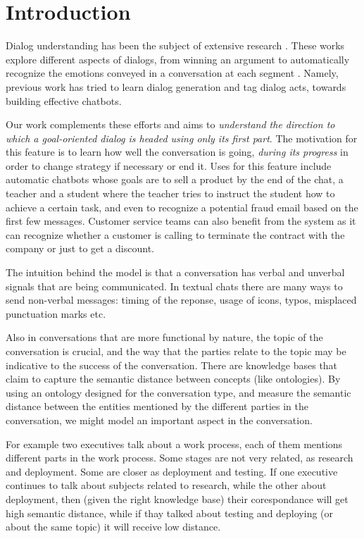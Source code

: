 \section{Introduction}\label{sec:into}
Dialog understanding has been the subject of 
extensive research \cite{BohusR03,BordesW16,GhazvininejadBC17,ShawarA03,DBLP:conf/icassp/JiB05,DBLP:conf/coling/WermterL96}. 
These works explore different aspects of dialogs, from winning an argument \cite{TanNDL16} 
to automatically recognize the emotions conveyed in a conversation at each segment \cite{AyadiKK11}. 
Namely, previous work \cite{ShawarA03,Jia09,ShawarA08,AngLS05,SurendranL06} has tried to learn dialog 
generation and tag dialog acts, towards building effective chatbots. 

Our work complements these efforts and aims to {\em understand the 
direction to which a goal-oriented dialog is headed using only its 
first part}. The motivation for this feature is to learn how 
well the conversation is going, {\em during its progress} in order 
to change strategy if necessary or end it. 
Uses for this feature include automatic chatbots whose goals 
are to sell a product by the end of the chat, a teacher and a student 
where the teacher tries to instruct the student how to achieve a certain task, 
and even to recognize a potential fraud email based on the first few 
messages.
Customer service teams can also benefit from the system as it can recognize 
whether a customer is calling to terminate the contract with the company 
or just to get a discount. 

The intuition behind the model is that a conversation has verbal and unverbal signals that are being
communicated. In textual chats there are many ways to send non-verbal messages: timing of the reponse, usage of icons, typos, misplaced punctuation marks etc.

Also in conversations that are more functional by nature, the topic of the conversation is crucial, and the way that the parties relate to the topic may be indicative to the success of the conversation. There are knowledge bases that claim to capture the semantic distance between concepts (like ontologies). By using an ontology designed for the conversation type, and measure the semantic distance between the entities mentioned by the different parties in the conversation, we might model an important aspect in the conversation.

For example two executives talk about a work process, each of them mentions different parts in the work process. Some stages are not very related, as research and deployment. Some are closer as deployment and testing. If one executive continues to talk about subjects related to research, while the other about deployment, then
(given the right knowledge base) their corespondance will get high semantic distance, while if thay talked about testing and deploying (or about the same topic)
it will receive low distance. 

